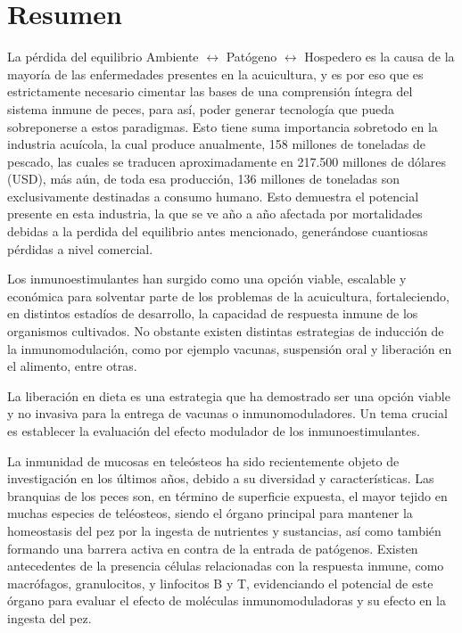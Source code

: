 \documentclass[12pt,letterpaper,oneside]{scrbook}
\begin{document}
\clearpage

\frontmatter

\chapter{Resumen}

La pérdida del equilibrio Ambiente \(\leftrightarrow\) Patógeno
\(\leftrightarrow\) Hospedero es la causa de la mayoría de las
enfermedades presentes en la acuicultura, y es por eso que es
estrictamente necesario cimentar las bases de una comprensión íntegra
del sistema inmune de peces, para así, poder generar tecnología que
pueda sobreponerse a estos paradigmas. Esto tiene suma importancia
sobretodo en la industria acuícola, la cual produce anualmente, 158
millones de toneladas de pescado, las cuales se traducen aproximadamente
en 217.500 millones de dólares (USD), más aún, de toda esa producción,
136 millones de toneladas son exclusivamente destinadas a consumo
humano. Esto demuestra el potencial presente en esta industria, la que
se ve año a año afectada por mortalidades debidas a la perdida del
equilibrio antes mencionado, generándose cuantiosas pérdidas a nivel
comercial.

Los inmunoestimulantes han surgido como una opción viable, escalable y
económica para solventar parte de los problemas de la acuicultura,
fortaleciendo, en distintos estadíos de desarrollo, la capacidad de
respuesta inmune de los organismos cultivados. No obstante existen
distintas estrategias de inducción de la inmunomodulación, como por
ejemplo vacunas, suspensión oral y liberación en el alimento, entre
otras.

La liberación en dieta es una estrategia que ha demostrado ser una
opción viable y no invasiva para la entrega de vacunas o
inmunomoduladores. Un tema crucial es establecer la evaluación del
efecto modulador de los inmunoestimulantes.

La inmunidad de mucosas en teleósteos ha sido recientemente objeto de
investigación en los últimos años, debido a su diversidad y
características. Las branquias de los peces son, en término de
superficie expuesta, el mayor tejido en muchas especies de teléosteos,
siendo el órgano principal para mantener la homeostasis del pez por la
ingesta de nutrientes y sustancias, así como también formando una
barrera activa en contra de la entrada de patógenos. Existen
antecedentes de la presencia células relacionadas con la respuesta
inmune, como macrófagos, granulocitos, y linfocitos B y T, evidenciando
el potencial de este órgano para evaluar el efecto de moléculas
inmunomoduladoras y su efecto en la ingesta del pez.
\end{document}
